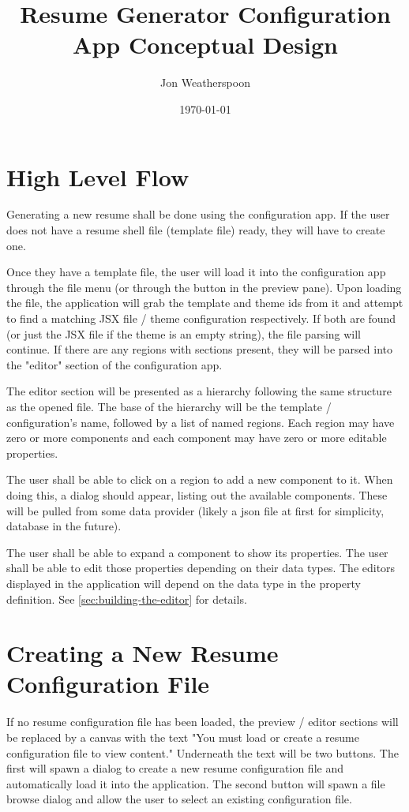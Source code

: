 \documentclass[12pt]{article}
\title{Resume Generator Configuration App Conceptual Design}
\author{Jon Weatherspoon}
\date{\today}
\begin{document}
    \maketitle 

    \tableofcontents

    \section{High Level Flow}
    Generating a new resume shall be done using the configuration app. 
    If the user does not have a resume shell file (template file) ready, they 
    will have to create one. 
    

    Once they have a template file, the user will load it into the configuration 
    app through the file menu (or through the button in the preview pane). Upon 
    loading the file, the application will grab the template and theme ids from 
    it and attempt to find a matching JSX file / theme configuration respectively. 
    If both are found (or just the JSX file if the theme is an empty string), the 
    file parsing will continue. If there are any regions with sections present, 
    they will be parsed into the "editor" section of the configuration app. 

    The editor section will be presented as a hierarchy following the same structure
    as the opened file. The base of the hierarchy will be the template / configuration's 
    name, followed by a list of named regions. Each region may have zero or more components
    and each component may have zero or more editable properties. 

    The user shall be able to click on a region to add a new component to it. When doing this, 
    a dialog should appear, listing out the available components. These will be pulled from 
    some data provider (likely a json file at first for simplicity, database in the future). 

    The user shall be able to expand a component to show its properties. The user shall be 
    able to edit those properties depending on their data types. The editors displayed in 
    the application will depend on the data type in the property definition. See 
    \ref{sec:building-the-editor} for details.

    \section{Creating a New Resume Configuration File}
    If no resume configuration file has been loaded, the preview / editor sections will be replaced 
    by a canvas with the text "You must load or create a resume configuration file to view content."
    Underneath the text will be two buttons. The first will spawn a dialog to create a new resume 
    configuration file and automatically load it into the application. The second button will spawn a 
    file browse dialog and allow the user to select an existing configuration file.  
\end{document}
